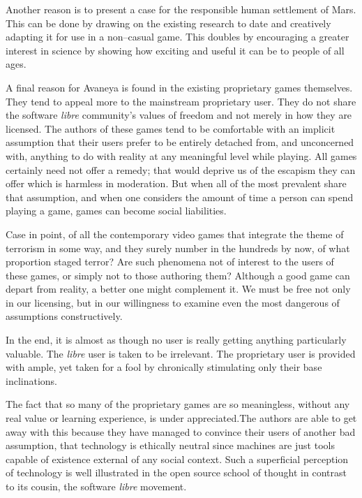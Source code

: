 Another reason is to present a case for the responsible human settlement of Mars. This can be done by drawing on the existing research to date and creatively adapting it for use in a non--casual game. This doubles by encouraging a greater interest in science by showing how exciting and useful it can be to people of all ages.

A final reason for Avaneya is found in the existing proprietary games themselves. They tend to appeal more to the mainstream proprietary user. They do not share the software {\it libre} community's values of freedom and not merely in how they are licensed. The authors of these games tend to be comfortable with an implicit assumption that their users prefer to be entirely detached from, and unconcerned with, anything to do with reality at any meaningful level while playing. All games certainly need not offer a remedy; that would deprive us of the escapism they can offer which is harmless in moderation. But when all of the most prevalent share that assumption, and when one considers the amount of time a person can spend playing a game, games can become social liabilities.

Case in point, of all the contemporary video games that integrate the theme of terrorism in some way, and they surely number in the hundreds by now, of what proportion staged terror? Are such phenomena not of interest to the users of these games, or simply not to those authoring them? Although a good game can depart from reality, a better one might complement it. We must be free not only in our licensing, but in our willingness to examine even the most dangerous of assumptions constructively. 

In the end, it is almost as though no user is really getting anything particularly valuable. The {\it libre} user is taken to be irrelevant. The proprietary user is provided with ample, yet taken for a fool by chronically stimulating only their base inclinations.

The fact that so many of the proprietary games are so meaningless, without any real value or learning experience, is under appreciated. The authors are able to get away with this because they have managed to convince their users of another bad assumption, that technology is ethically neutral since machines are just tools capable of existence external of any social context. Such a superficial perception of technology is well illustrated in the open source school of thought in contrast to its cousin, the software {\it libre} movement. 

